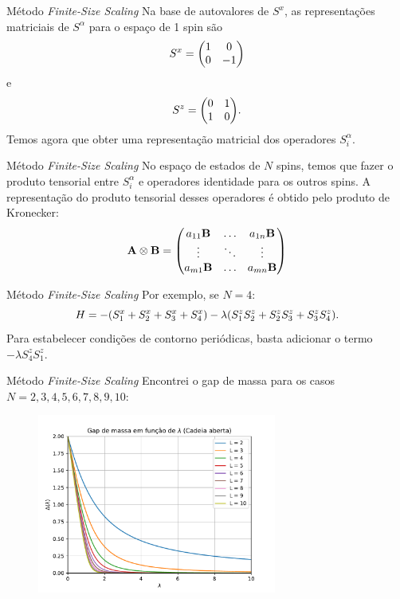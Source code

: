 \documentclass[brazil]{beamer}
\begin{document}
\begin{frame}{Método \textit{Finite-Size Scaling}}
    Na base de autovalores de \( S^x \), as representações matriciais de \( S^\alpha \) para o espaço de 1 spin são
    \begin{equation}
        S^x = \mqty(
        1 & 0 \\
        0 & -1
        )
    \end{equation}
    e
    \begin{equation}
        S^z = \mqty(
        0 & 1 \\
        1 & 0
        ) .
    \end{equation}
    Temos agora que obter uma representação matricial dos operadores \( S_i^\alpha \).
\end{frame}

\begin{frame}{Método \textit{Finite-Size Scaling}}
    No espaço de estados de \( N \) spins, temos que fazer o produto tensorial entre \( S_i^\alpha \) e operadores identidade para os outros spins.
    A representação do produto tensorial desses operadores é obtido pelo produto de Kronecker:
    \begin{equation}
        \vb{A} \otimes \vb{B} = \mqty(
        a_{11} \vb{B} & \dots & a_{1n} \vb{B} \\
        \vdots & \ddots & \vdots \\
        a_{m1} \vb{B} & \dots & a_{mn} \vb{B}
        )
    \end{equation}
\end{frame}

\begin{frame}{Método \textit{Finite-Size Scaling}}
    Por exemplo, se \( N = 4 \):
    \begin{equation}
        H = - \qty(S_1^x + S_2^x + S_3^x + S_4^x) - \lambda (S_1^z S_2^z + S_2^z S_3^z + S_3^z S_4^z) .
    \end{equation}
    Para estabelecer condições de contorno periódicas, basta adicionar o termo \( - \lambda S_4^z S_1^z \).
\end{frame}

\begin{frame}{Método \textit{Finite-Size Scaling}}
    Encontrei o gap de massa para os casos \( N = 2, 3, 4, 5, 6, 7, 8, 9, 10 \):
    \begin{figure}
        \centering
        \includegraphics[width=0.7\textwidth]{gap.pdf}
    \end{figure}
\end{frame}
\end{document}
